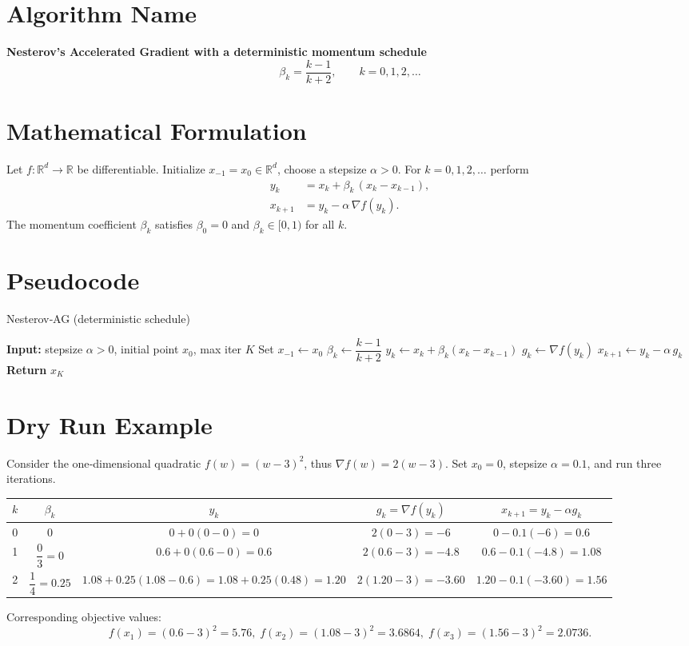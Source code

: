 \documentclass{article}
\begin{document}
\section*{Algorithm Name}
\textbf{Nesterov’s Accelerated Gradient with a deterministic momentum schedule}
\[
\beta_k=\frac{k-1}{k+2},\qquad k=0,1,2,\dots
\]

\section*{Mathematical Formulation}
Let $f:\mathbb{R}^d\rightarrow\mathbb{R}$ be differentiable.  
Initialize $x_{-1}=x_0\in\mathbb{R}^d$, choose a stepsize $\alpha>0$.  
For $k=0,1,2,\dots$ perform
\begin{align}
y_k &= x_k + \beta_k\,(x_k-x_{k-1}), \label{eq:y}\\
x_{k+1} &= y_k - \alpha \,\nabla f(y_k). \label{eq:x}
\end{align}
The momentum coefficient $\beta_k$ satisfies $\beta_0=0$ and $\beta_k\in[0,1)$ for all $k$.

\section*{Pseudocode}
\begin{algorithm}[H]
\caption{Nesterov‑AG (deterministic schedule)}
\begin{algorithmic}[1]
\State \textbf{Input:} stepsize $\alpha>0$, initial point $x_0$, max iter $K$
\State Set $x_{-1}\gets x_0$
    \State $\beta_k \gets \dfrac{k-1}{k+2}$ 
    \State $y_k \gets x_k + \beta_k (x_k - x_{k-1})$ \label{alg:y}
    \State $g_k \gets \nabla f(y_k)$
    \State $x_{k+1} \gets y_k - \alpha\, g_k$ \label{alg:x}
\EndFor
\State \textbf{Return} $x_K$
\end{algorithmic}
\end{algorithm}

\section*{Dry Run Example}
Consider the one‑dimensional quadratic $f(w)=(w-3)^2$, thus $\nabla f(w)=2(w-3)$.  
Set $x_0=0$, stepsize $\alpha=0.1$, and run three iterations.

\begin{center}
\begin{tabular}{c|c|c|c|c}
$k$ & $\beta_k$ & $y_k$ & $g_k=\nabla f(y_k)$ & $x_{k+1}=y_k-\alpha g_k$ \\ \hline
0 & $0$ & $0+0(0-0)=0$ & $2(0-3)=-6$ & $0-0.1(-6)=0.6$\\
1 & $\dfrac{0}{3}=0$ & $0.6+0(0.6-0)=0.6$ & $2(0.6-3)=-4.8$ & $0.6-0.1(-4.8)=1.08$\\
2 & $\dfrac{1}{4}=0.25$ & $1.08+0.25(1.08-0.6)=1.08+0.25(0.48)=1.20$ & $2(1.20-3)=-3.60$ & $1.20-0.1(-3.60)=1.56$
\end{tabular}
\end{center}
Corresponding objective values:
\[
f(x_1)= (0.6-3)^2=5.76,\;
f(x_2)=(1.08-3)^2=3.6864,\;
f(x_3)=(1.56-3)^2=2.0736.
\]
\end{document}
